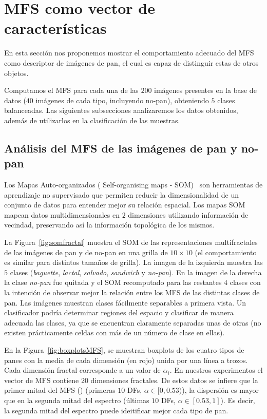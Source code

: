 \documentclass[spanish,a4paper,openright,11pt]{book}
\begin{document}
\section{MFS como vector de caracter\'isticas}

En esta sección nos proponemos mostrar el comportamiento adecuado del MFS como descriptor de imágenes de pan, el cual es capaz de distinguir estas de otros objetos.

Computamos el MFS para cada una de las $200$ imágenes presentes en la base de datos ($40$ imágenes de cada tipo, incluyendo no-pan), obteniendo $5$ clases balanceadas.  Las siguientes subsecciones analizaremos los datos obtenidos, además de utilizarlos en la clasificación de las muestras.

\subsection{Análisis del MFS de las imágenes de pan y no-pan}

Los Mapas Auto-organizados ( Self-organising maps -  SOM)~\cite{Kohonen2001} son herramientas de aprendizaje no supervisado que permiten reducir la dimensionalidad de un conjunto de datos para entender mejor su relación espacial. Los mapas SOM mapean datos multidimensionales en $2$ dimensiones utilizando información de vecindad, preservando así la información topológica de los mismos.

La Figura~\ref{fig:somfractal} muestra el  SOM de las representaciones multifractales de las imágenes de pan y de no-pan en una grilla de $10\times 10$ (el comportamiento es similar para distintos tamaños de grilla). La imagen de la izquierda muestra las $5$ clases ({\em baguette}, {\em lactal}, {\em salvado}, {\em sandwich} y {\em no-pan}). En la imagen de la derecha la clase {\em no-pan} fue quitada y el SOM recomputado para las restantes $4$ clases con la intención de observar mejor la relación entre los MFS de las distintas clases de pan. Las imágenes muestran clases fácilmente separables a primera vista. Un clasificador podría determinar regiones del espacio y clasificar de manera adecuada las clases, ya que se encuentran claramente separadas unas de otras (no existen prácticamente celdas con más de un número de clase en ellas).

En la Figura~\ref{fig:boxplotsMFS}, se muestran boxplots de los cuatro tipos de panes con la media de cada dimensión (en rojo) unida por una línea a trozos. Cada dimensión fractal corresponde a un valor de $\alpha_{i}$. En nuestros experimentos el vector de MFS contiene $20$ dimensiones fractales. De estos datos se infiere que la primer mitad del MFS () (primeras $10$ DFs, $\alpha \in [0,0.53)$), la dispersión es mayor que en la segunda mitad del espectro  (últimas $10$ DFs, $\alpha \in [0.53,1]$). Es decir, la segunda mitad del espectro puede ideitificar mejor cada tipo de pan.
\end{document}
